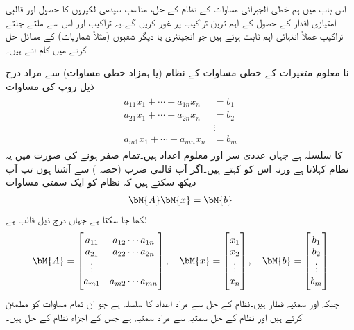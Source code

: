 اس باب میں ہم خطی الجبرائی مساوات کے نظام کے حل، مناسب سیدھی لکیروں کا حصول اور قالبی امتیازی اقدار کے حصول کے  اہم ترین تراکیب پر غور کریں گے۔یہ تراکیب اور اس سے ملتے جلتے تراکیب عملاً انتہائی اہم ثابت ہوتے ہیں جو انجینئری یا دیگر شعبوں (مثلاً شماریات) کے مسائل حل کرنے میں کام آتے ہیں۔

 نا معلوم متغیرات   کے  خطی مساوات کے نظام (یا   ہمزاد خطی مساوات) سے مراد درج ذیل روپ کی مساوات
\begin{gather}
\begin{aligned}\label{مساوات_خطی_اعدادی_قالبی_نظام_الف}
a_{11}x_1+\cdots+a_{1n}x_n&=b_1\\
a_{21}x_1+\cdots+a_{2n}x_n&=b_2\\
&\vdots\\
a_{m1}x_1+\cdots+a_{mn}x_n&=b_m
\end{aligned}
\end{gather}  
کا سلسلہ ہے  جہاں عددی سر  اور  معلوم اعداد ہیں۔تمام  صفر ہونے کی صورت میں یہ نظام  کہلاتا ہے ورنہ اس کو  کہتے ہیں۔اگر آپ قالبی ضرب (حصہ ) سے آشنا ہوں  تب آپ دیکھ سکتے ہیں کہ نظام  کو ایک سمتی مساوات
\begin{align}\label{مساوات_خطی_اعدادی_قالبی_نظام_ب}
\bM{A}\bM{x}=\bM{b}
\end{align}
لکھا جا سکتا ہے جہاں   درج ذیل  قالب ہے
\begin{align*}
\bM{A}=
\begin{bmatrix}
a_{11}&a_{12}\cdots a_{1n}\\
a_{21}&a_{22}\cdots a_{2n}\\
\vdots\\
a_{m1}&a_{m2}\cdots a_{mn}
\end{bmatrix},
\quad
\bM{x}=
\begin{bmatrix}
x_1\\
x_2\\
\vdots\\
x_n
\end{bmatrix},
\quad
\bM{b}=
\begin{bmatrix}
b_1\\
b_2\\
\vdots\\
b_m
\end{bmatrix}
\end{align*}
جبکہ  اور  سمتیہ قطار ہیں۔نظام  کے حل سے مراد اعداد  کا سلسلہ ہے جو ان تمام  مساوات کو مطمئن کرتے ہیں اور نظام  کے حل سمتیہ سے مراد سمتیہ  ہے جس کے اجزاء  نظام  کے حل ہیں۔

